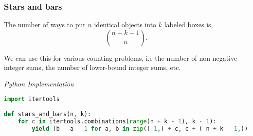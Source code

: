 \documentclass{article}
\begin{document}
    \subsubsection{Stars and bars}

    The number of ways to put $n$ identical objects into $k$ labeled boxes is,
    \[
    \binom{n+k-1}{n}.
    \]
    
    We can use this for various counting problems, i.e the number of non-negative integer sums, the number of lower-bound integer sums, etc.
    
\vspace{8pt} \emph{Python Implementation}
\begin{lstlisting}[language=Python]
import itertools

def stars_and_bars(n, k):
    for c in itertools.combinations(range(n + k - 1), k - 1):
        yield [b - a - 1 for a, b in zip((-1,) + c, c + ( n + k - 1,))]
\end{lstlisting}

    
    
    
    
    
\end{document}
